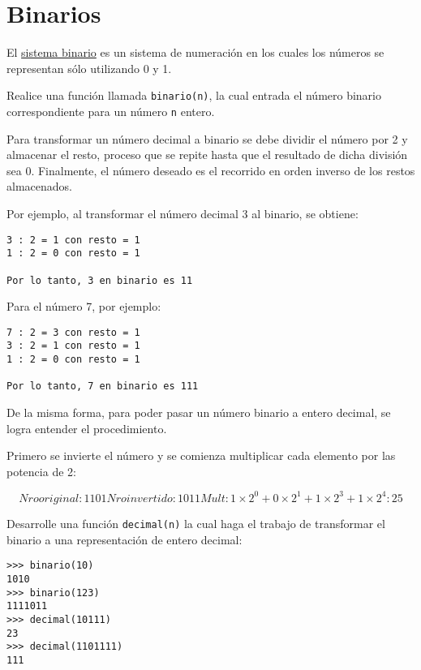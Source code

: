 \section{Binarios}

El \href{http://es.wikipedia.org/wiki/Sistema\_binario}{sistema binario}
es un sistema de numeración en los cuales los números se representan
sólo utilizando 0 y 1.

Realice una función llamada \lstinline!binario(n)!, la cual entrada el
número binario correspondiente para un número \lstinline!n! entero.

Para transformar un número decimal a binario se debe dividir el número
por 2 y almacenar el resto, proceso que se repite hasta que el resultado
de dicha división sea 0. Finalmente, el número deseado es el recorrido
en orden inverso de los restos almacenados.

Por ejemplo, al transformar el número decimal 3 al binario, se obtiene:

\begin{lstlisting}
3 : 2 = 1 con resto = 1
1 : 2 = 0 con resto = 1

Por lo tanto, 3 en binario es 11
\end{lstlisting}

Para el número 7, por ejemplo:

\begin{lstlisting}
7 : 2 = 3 con resto = 1
3 : 2 = 1 con resto = 1
1 : 2 = 0 con resto = 1

Por lo tanto, 7 en binario es 111
\end{lstlisting}

De la misma forma, para poder pasar un número binario a entero decimal,
se logra entender el procedimiento.

Primero se invierte el número y se comienza multiplicar cada elemento
por las potencia de 2:

\[Nro original: 1101
Nro invertido: 1011
Mult: 1 \times 2^{0} + 0 \times 2^{1} + 1 \times 2^{3} + 1 \times 2^{4} : 25\]

Desarrolle una función \lstinline!decimal(n)! la cual haga el trabajo de
transformar el binario a una representación de entero decimal:

\begin{lstlisting}
>>> binario(10)
1010
>>> binario(123)
1111011
>>> decimal(10111)
23
>>> decimal(1101111)
111
\end{lstlisting}

